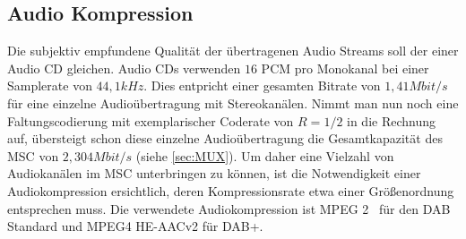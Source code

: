 \subsection{Audio Kompression}
Die subjektiv empfundene Qualität der übertragenen Audio Streams soll der einer Audio CD gleichen. Audio CDs verwenden $16$ PCM pro Monokanal bei einer Samplerate von $44,1 kHz$. Dies entpricht einer gesamten Bitrate von $1,41 Mbit/s$ für eine einzelne Audioübertragung mit Stereokanälen. Nimmt man nun noch eine Faltungscodierung mit exemplarischer Coderate von $R=1/2$ in die Rechnung auf, übersteigt schon diese einzelne Audioübertragung die Gesamtkapazität des \ac{MSC} von $2,304 Mbit/s$ (siehe \ref{sec:MUX}). Um daher eine Vielzahl von Audiokanälen im \ac{MSC} unterbringen zu können, ist die Notwendigkeit einer Audiokompression ersichtlich, deren Kompressionsrate etwa einer Größenordnung entsprechen muss. Die verwendete Audiokompression ist \ac{MPEG 2}~\cite{etsi:mp2} für den DAB Standard und MPEG4 HE-AACv2 für DAB+. 

